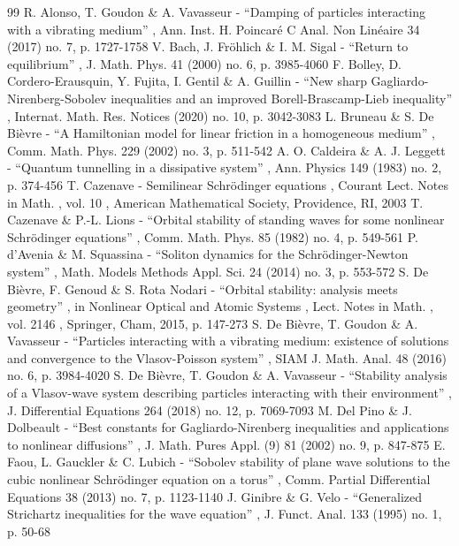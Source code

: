 \documentclass[11pt]{article}
\theoremstyle{definition}
\begin{document}
\begin{thebibliography}{99}
 R. Alonso, T. Goudon \& A. Vavasseur - “Damping of particles interacting with a vibrating medium” , Ann. Inst. H. Poincaré C Anal. Non Linéaire 34 (2017) no. 7, p. 1727-1758
 V. Bach, J. Fröhlich \& I. M. Sigal - “Return to equilibrium” , J. Math. Phys. 41 (2000) no. 6, p. 3985-4060
 F. Bolley, D. Cordero-Erausquin, Y. Fujita, I. Gentil \& A. Guillin - “New sharp Gagliardo-Nirenberg-Sobolev inequalities and an improved Borell-Brascamp-Lieb inequality” , Internat. Math. Res. Notices (2020) no. 10, p. 3042-3083
 L. Bruneau \& S. De Bièvre - “A Hamiltonian model for linear friction in a homogeneous medium” , Comm. Math. Phys. 229 (2002) no. 3, p. 511-542
 A. O. Caldeira \& A. J. Leggett - “Quantum tunnelling in a dissipative system” , Ann. Physics 149 (1983) no. 2, p. 374-456
 T. Cazenave - Semilinear Schrödinger equations , Courant Lect. Notes in Math. , vol. 10 , American Mathematical Society, Providence, RI, 2003
 T. Cazenave \& P.-L. Lions - “Orbital stability of standing waves for some nonlinear Schrödinger equations” , Comm. Math. Phys. 85 (1982) no. 4, p. 549-561
 P. d’Avenia \& M. Squassina - “Soliton dynamics for the Schrödinger-Newton system” , Math. Models Methods Appl. Sci. 24 (2014) no. 3, p. 553-572
 S. De Bièvre, F. Genoud \& S. Rota Nodari - “Orbital stability: analysis meets geometry” , in Nonlinear Optical and Atomic Systems , Lect. Notes in Math. , vol. 2146 , Springer, Cham, 2015, p. 147-273
 S. De Bièvre, T. Goudon \& A. Vavasseur - “Particles interacting with a vibrating medium: existence of solutions and convergence to the Vlasov-Poisson system” , SIAM J. Math. Anal. 48 (2016) no. 6, p. 3984-4020
 S. De Bièvre, T. Goudon \& A. Vavasseur - “Stability analysis of a Vlasov-wave system describing particles interacting with their environment” , J. Differential Equations 264 (2018) no. 12, p. 7069-7093
 M. Del Pino \& J. Dolbeault - “Best constants for Gagliardo-Nirenberg inequalities and applications to nonlinear diffusions” , J. Math. Pures Appl. (9) 81 (2002) no. 9, p. 847-875
 E. Faou, L. Gauckler \& C. Lubich - “Sobolev stability of plane wave solutions to the cubic nonlinear Schrödinger equation on a torus” , Comm. Partial Differential Equations 38 (2013) no. 7, p. 1123-1140
 J. Ginibre \& G. Velo - “Generalized Strichartz inequalities for the wave equation” , J. Funct. Anal. 133 (1995) no. 1, p. 50-68

\end{thebibliography}
\end{document}
